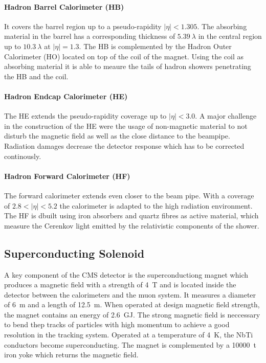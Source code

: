 \paragraph{Hadron Barrel Calorimeter (HB)}
It covers the barrel region up to a pseudo-rapidity $|\eta| < 1.305$. The
absorbing material in the barrel has a corresponding thickness of
$\SI{5.39}{\lambda}$ in the central region up to $\SI{10.3}{\lambda}$ at $|\eta|
= 1.3$. The HB is complemented by the Hadron Outer Calorimeter (HO) located on
top of the coil of the magnet. Using the coil as absorbing material it is able
to meaure the tails of hadron showers penetrating the HB and the coil.

\paragraph{Hadron Endcap Calorimeter (HE)} The HE extends the pseudo-rapidity
coverage up to $|\eta| < 3.0$. A major challenge in the construction of the HE
were the usage of non-magnetic material to not disturb the magnetic field as
well as the close distance to the beampipe. Radiation damages decrease the
detector response which has to be corrected continously. 

\paragraph{Hadron Forward Calorimeter (HF)} 
The forward calorimeter extends even closer to the beam pipe. With a coverage of
$2.8 < |\eta| < 5.2$ the calorimeter is adapted to the high radiation
environment. The HF is dbuilt using iron absorbers and quartz fibres as active
material, which measure the Cerenkov light emitted by the relativistic
components of the shower.

\subsection{Superconducting Solenoid}

A key component of the CMS detector is the superconductiong magnet which
produces a magnetic field with a strength of \SI{4}{\tesla} and is located
inside the detector between the calorimeters and the muon system. It measures a
diameter of \SI{6}{\meter} and a length of \SI{12.5}{\meter}. When operated at
design magnetic field strength, the magnet contains an energy of
\SI{2.6}{\giga\joule}. The strong magnetic field is neccessary to bend thep
tracks of particles with high momentum to achieve a good resolution in the
tracking system. Operated at a temperature of \SI{4}{\kelvin}, the NbTi conductors become
superconducting. The magnet is complemented by a \SI{10000}{\tonne} iron yoke
which returns the magnetic field.

